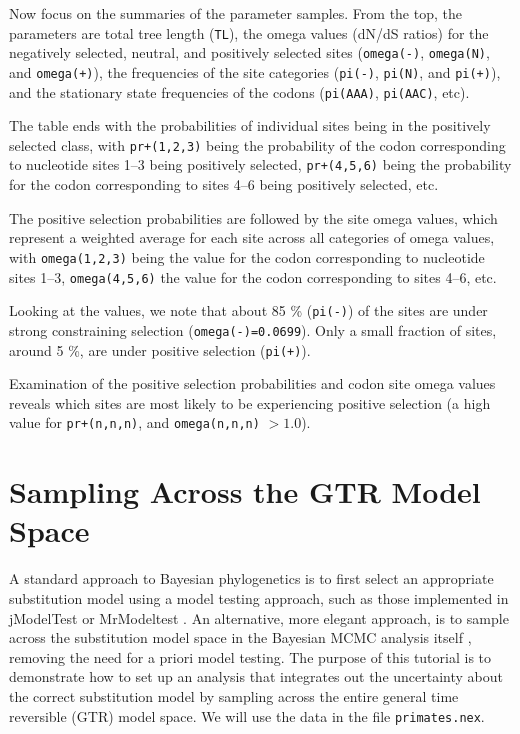 \documentclass[12pt]{book}
\begin{document}
Now focus on the summaries of the parameter samples. From the top, the parameters are total tree
length (\texttt{TL}), the omega values (dN/dS ratios) for the negatively selected, neutral, and
positively selected sites (\texttt{omega(-)}, \texttt{omega(N)}, and \texttt{omega(+)}), the
frequencies of the site categories (\texttt{pi(-)}, \texttt{pi(N)}, and \texttt{pi(+)}), and the
stationary state frequencies of the codons (\texttt{pi(AAA)}, \texttt{pi(AAC)}, etc).

The table ends with the probabilities of individual sites being in the positively selected class,
with \texttt{pr+(1,2,3)} being the probability of the codon corresponding to nucleotide sites 1--3
being positively selected, \texttt{pr+(4,5,6)} being the probability for the codon corresponding to
sites 4--6 being positively selected, etc.

The positive selection probabilities are followed by the site omega values, which represent a
weighted average for each site across all categories of omega values, with \texttt{omega(1,2,3)}
being the value for the codon corresponding to nucleotide sites 1--3, \texttt{omega(4,5,6)} the
value for the codon corresponding to sites 4--6, etc.

Looking at the values, we note that about 85 \% (\texttt{pi(-)}) of the sites are under strong
constraining selection (\texttt{omega(-)=0.0699}). Only a small fraction of sites, around 5 \%, are
under positive selection (\texttt{pi(+)}).

Examination of the positive selection probabilities and codon site omega values reveals which sites
are most likely to be experiencing positive selection (a high value for \texttt{pr+(n,n,n)}, and
\texttt{omega(n,n,n)} $> 1.0$).

\section{Sampling Across the GTR Model Space}
\label{sampleGTR}

A standard approach to Bayesian phylogenetics is to first select an appropriate substitution model
using a model testing approach, such as those implemented in jModelTest \citep{posada08} or
MrModeltest \citep{nylander04b}. An alternative, more elegant approach, is to sample across the
substitution model space in the Bayesian MCMC analysis itself \citep{huelsenbeck04d}, removing the
need for a priori model testing. The purpose of this tutorial is to demonstrate how to set up an
analysis that integrates out the uncertainty about the correct substitution model by sampling
across the entire general time reversible (GTR) model space. We will use the data in the file
\texttt{primates.nex}.
\end{document}
